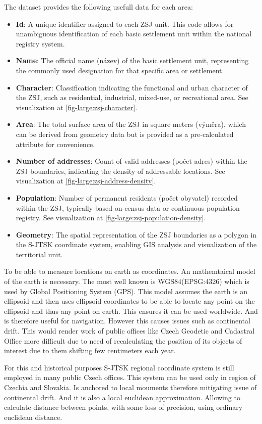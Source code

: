 The dataset provides the following usefull data for each area:

\begin{itemize}
    \item \textbf{Id}: A unique identifier assigned to each ZSJ unit. This code allows for unambiguous identification of each basic settlement unit within the national registry system.
    \item \textbf{Name}: The official name (název) of the basic settlement unit, representing the commonly used designation for that specific area or settlement.
    \item \textbf{Character}: Classification indicating the functional and urban character of the ZSJ, such as residential, industrial, mixed-use, or recreational area. See visualization at \ref{fig-large:zsj-character}.
    \item \textbf{Area}: The total surface area of the ZSJ in square meters (výměra), which can be derived from geometry data but is provided as a pre-calculated attribute for convenience.
    \item \textbf{Number of addresses}: Count of valid addresses (počet adres) within the ZSJ boundaries, indicating the density of addressable locations. See visualization at \ref{fig-large:zsj-address-density}.
    \item \textbf{Population}: Number of permanent residents (počet obyvatel) recorded within the ZSJ, typically based on census data or continuous population registry. See visualization at \ref{fig-large:zsj-population-density}.
    \item \textbf{Geometry}: The spatial representation of the ZSJ boundaries as a polygon in the S-JTSK coordinate system, enabling GIS analysis and visualization of the territorial unit.
\end{itemize}

\begin{kaobox}[frametitle=Coordinate reference system - WGS84 and S-JTSK coordinate system]
    To be able to measure locations on earth as coordinates. An mathemtaical model of the earth is necessary. The most well known is WGS84(EPSG:4326) which is used by Global Positioning System (GPS). This model assumes the earth is an ellipsoid and then uses ellipsoid coordinates to be able to locate any point on the ellipsoid and thus any point on earth. This ensures it can be used worldwide. And is therefore useful for navigation. However this causes issues such as continental drift. This would render work of public offices like Czech Geodetic and Cadastral Office  more difficult due to need of recalculating the position of its objects of interest due to them shifting few centimeters each year.

    For this and historical purposes S-JTSK  regional coordinate system is still employed in many public Czech offices. This system can be used only in region of Czechia and Slovakia. Is anchored to local mouments therefore mitigating issue of continental drift. And it is also a local euclidean approximation. Allowing to calculate distance between points, with some loss of precision, using ordinary euclidean distance.
\end{kaobox}

